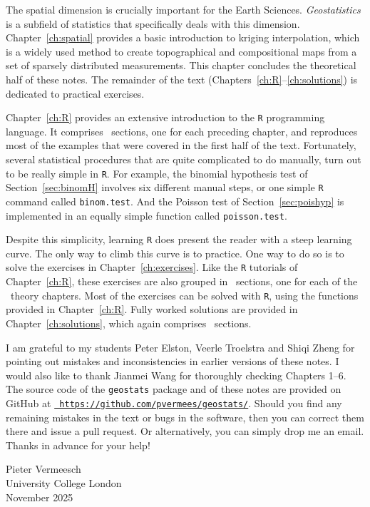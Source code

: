 The spatial dimension is crucially important for the Earth
Sciences. \emph{Geostatistics} is a subfield of statistics that
specifically deals with this dimension. Chapter~\ref{ch:spatial}
provides a basic introduction to kriging interpolation, which is a
widely used method to create topographical and compositional maps from
a set of sparsely distributed measurements. This chapter concludes the
theoretical half of these notes. The remainder of the text
(Chapters~\ref{ch:R}--\ref{ch:solutions}) is dedicated to practical
exercises.\medskip

Chapter~\ref{ch:R} provides an extensive introduction to the
\texttt{R} programming language. It comprises \nch~sections, one for
each preceding chapter, and reproduces most of the examples that were
covered in the first half of the text. Fortunately, several
statistical procedures that are quite complicated to do manually, turn
out to be really simple in \texttt{R}. For example, the binomial
hypothesis test of Section~\ref{sec:binomH} involves six different
manual steps, or one simple \texttt{R} command called
\texttt{binom.test}. And the Poisson test of Section~\ref{sec:poishyp}
is implemented in an equally simple function called
\texttt{poisson.test}.\medskip

Despite this simplicity, learning \texttt{R} does present the reader
with a steep learning curve. The only way to climb this curve is to
practice. One way to do so is to solve the exercises in
Chapter~\ref{ch:exercises}. Like the \texttt{R} tutorials of
Chapter~\ref{ch:R}, these exercises are also grouped in \nch~sections,
one for each of the \nch~theory chapters. Most of the exercises can be
solved with \texttt{R}, using the functions provided in
Chapter~\ref{ch:R}. Fully worked solutions are provided in
Chapter~\ref{ch:solutions}, which again comprises \nch~sections.\medskip

I am grateful to my students Peter Elston, Veerle Troelstra and Shiqi
Zheng for pointing out mistakes and inconsistencies in earlier
versions of these notes. I would also like to thank Jianmei Wang for
thoroughly checking Chapters 1--6. The source code of the
\texttt{geostats} package and of these notes are provided on GitHub at
\href{https://github.com/pvermees/geostats/}{\tt
  https://github.com/pvermees/geostats/}.  Should you find any
remaining mistakes in the text or bugs in the software, then you can
correct them there and issue a pull request. Or alternatively, you can
simply drop me an email. Thanks in advance for your help!\medskip

\begin{flushright}
  Pieter Vermeesch\\ University College London\\ November 2025
\end{flushright}
